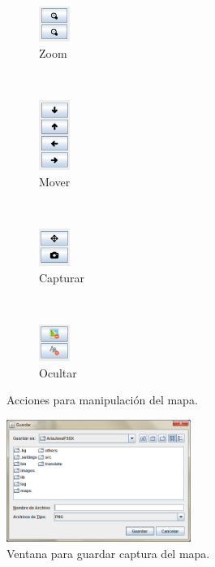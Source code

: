\documentclass[11pt,twoside,A5]{article}
\begin{document}
\begin{figure}[H]
        \centering
        \begin{subfigure}[b]{0.2\linewidth}
        		\centering
                \includegraphics[width=1cm]{botones-zoom.png}
                \caption{Zoom}
                \label{subfig:botones-zoom}
        \end{subfigure}
        ~ 
        \begin{subfigure}[b]{0.2\linewidth}
        		\centering
                \includegraphics[width=1cm]{botones-mover-mapa.png}
                \caption{Mover}
                \label{subfig:botones-mover-mapa}
        \end{subfigure}
        ~ 
        \begin{subfigure}[b]{0.2\linewidth}
        		\centering
                \includegraphics[width=1cm]{botones-centrar-capturar.png}
                \caption{Capturar}
                \label{subfig:botones-centrar-capturar}
        \end{subfigure}
        ~ 
        \begin{subfigure}[b]{0.2\linewidth}
        		\centering
                \includegraphics[width=1cm]{botones-ocultar-mapa.png}
                \caption{Ocultar}
                \label{subfig:botones-ocultar-mapa}
        \end{subfigure}
        \caption{Acciones para manipulación del mapa.}
        \label{fig:botones-mapa}
\end{figure}

\begin{figure}[H]
\begin{center}
\includegraphics[width=6cm]{guardar-imagen.png} 
\caption{Ventana para guardar captura del mapa.}
\label{fig:guardar-imagen}
\end{center}
\end{figure} 
\end{document}
